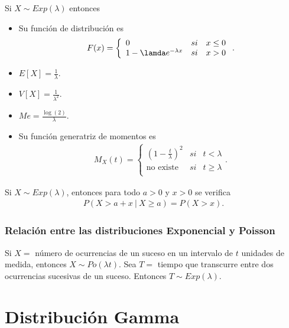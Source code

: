 \begin{obs}
Si $X \sim Exp(\lambda)$ entonces
\begin{itemize}
    \item Su función de distribución es
    \begin{align*}
        F(x) = \left\{ \begin{array}{lcc}
             0 &  si  & x \leq 0\\
            1 - \lamda e^{-\lambda x} &  si  & x > 0\\
             \end{array}
        \right. . 
    \end{align*}
    \item $E[X] = \frac{1}{\lambda}$.
    \item $V[X] = \frac{1}{\lambda^2}$.
    \item $Me = \frac{\log(2)}{\lambda}$.
    \item Su función generatriz de momentos es
    \begin{align*}
        M_X(t) = \left\{ \begin{array}{lcc}
             \left( 1 - \frac{t}{\lambda} \right)^2 &  si  & t < \lambda\\
             \text{no existe} &  si  & t \ge \lambda\\
             \end{array}
        \right. . 
    \end{align*}
\end{itemize}
\end{obs}

\begin{teo}
Si $X \sim Exp(\lambda)$, entonces para todo $a > 0$ y $x > 0$ se verifica
\begin{align*}
    P(X > a + x \ | \ X \ge a) = P(X > x).
\end{align*}
\end{teo}

\subsubsection{Relación entre las distribuciones Exponencial y Poisson}

Si $X = $ número de ocurrencias de un suceso en un intervalo de $t$ unidades de medida, entonces $X\sim Po(\lambda t)$. Sea $T = $ tiempo que transcurre entre dos ocurrencias sucesivas de un suceso. Entonces $T \sim Exp(\lambda)$.

\section{Distribución Gamma}

